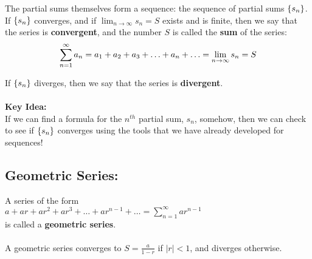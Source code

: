 \documentclass[10pt]{article}
\begin{document}

The partial sums themselves form a sequence: the sequence of partial sums \(\lbrace s_n\rbrace\).\\


If \(\lbrace s_n\rbrace\) converges, and if \(\lim_{n\rightarrow\infty} s_n = S\) exists and is finite, then we say that the series is \textbf{convergent}, and the number \(S\) is called the \textbf{sum} of the series:\\

\[
\sum_{n=1}^\infty a_n = a_1 + a_2 + a_3 + \ldots + a_n + \ldots = \lim_{n\rightarrow\infty} s_n =S
\]

If \(\lbrace s_n\rbrace\) diverges, then we say that the series is \textbf{divergent}.\\

~\\

\textbf{Key Idea:}\\
If we can find a formula for the \(n^{th}\) partial sum, \(s_n\), somehow, then we can check to see if \(\lbrace s_n\rbrace\) converges using the tools that we have already developed for sequences!



\vspace*{.1in}

\subsection*{Geometric Series:} 
A series of the form\\
\( a+ ar+ ar^2+ ar^3+ \ldots+ ar^{n-1}+\ldots = \sum_{n=1}^\infty a r^{n-1}\)\\
is called a \textbf{geometric series}. \\~\\
A geometric series converges to \(S=\frac{a}{1-r}\) if \(|r|<1\), and diverges otherwise.



\end{document}
